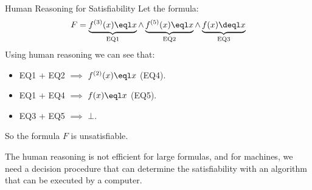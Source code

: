 \begin{example}{Human Reasoning for Satisfiability}
    Let the formula:
    \begin{equation*}
        F = \underbrace{f^{(3)}(x) \eql x}_{\text{EQ1}} \land
        \underbrace{f^{(5)}(x) \eql x}_{\text{EQ2}} \land 
        \underbrace{f(x) \deql x}_{\text{EQ3}}
    \end{equation*}
    Using human reasoning we can see that:
    \begin{itemize}
        \item EQ1 + EQ2 $\implies$ $f^{(2)}(x) \eql x$ (EQ4).
        \item EQ1 + EQ4 $\implies$ $f(x) \eql x$ (EQ5).
        \item EQ3 + EQ5 $\implies$ $\bot$.
    \end{itemize}
    So the formula $F$ is unsatisfiable.
\end{example}

The human reasoning is not efficient for large formulas, and 
for machines, we need a decision procedure that can determine
the satisfiability with an algorithm that can be executed by a computer.

